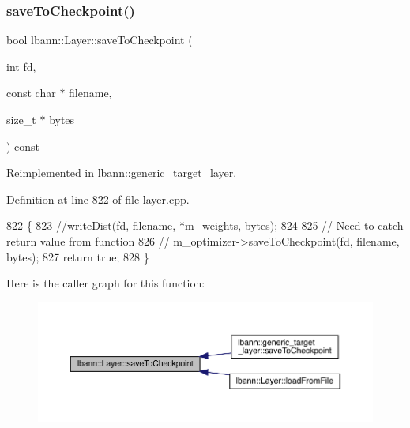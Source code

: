 \subsubsection{\texorpdfstring{save\+To\+Checkpoint()}{saveToCheckpoint()}}
{\footnotesize\ttfamily bool lbann\+::\+Layer\+::save\+To\+Checkpoint (\begin{DoxyParamCaption}\item[{int}]{fd,  }\item[{const char $\ast$}]{filename,  }\item[{size\+\_\+t $\ast$}]{bytes }\end{DoxyParamCaption}) const\hspace{0.3cm}{\ttfamily [virtual]}}



Reimplemented in \hyperlink{classlbann_1_1generic__target__layer_aff8b79ff0392bd78c44a5a4f6b6ef549}{lbann\+::generic\+\_\+target\+\_\+layer}.



Definition at line 822 of file layer.\+cpp.


\begin{DoxyCode}
822                                                                               \{
823   \textcolor{comment}{//writeDist(fd, filename, *m\_weights, bytes);}
824   
825   \textcolor{comment}{// Need to catch return value from function}
826   \textcolor{comment}{// m\_optimizer->saveToCheckpoint(fd, filename, bytes);}
827   \textcolor{keywordflow}{return} \textcolor{keyword}{true};
828 \}
\end{DoxyCode}
Here is the caller graph for this function\+:\nopagebreak
\begin{figure}[H]
\begin{center}
\leavevmode
\includegraphics[width=350pt]{classlbann_1_1Layer_a994a4beabbace598193b1611eb06b07e_icgraph}
\end{center}
\end{figure}
\mbox{\label{classlbann_1_1Layer_a131876b692c0e68c95d9ae1a86c446df}} 
